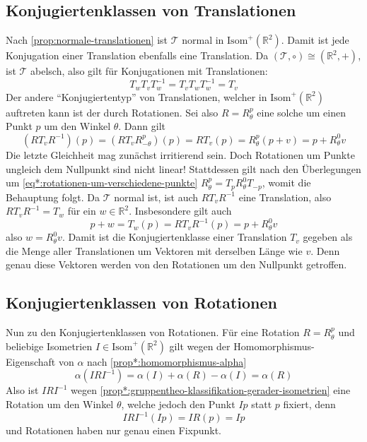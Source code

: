 \documentclass[a4paper, ngerman]{article}
\numberwithin{equation}{chapter}
\theoremstyle{plain}
\theoremstyle{definition}
\newcommand{\geradisometr}{\ensuremath{\mathrm{Isom}^+(\mathbb R^2)}}
\begin{document}
\subsection{Konjugiertenklassen von Translationen}\label{subsec:konjugiertenklassen-von-translationen}
Nach \cref{prop:normale-translationen} ist \(\mathcal T\) normal in \(\geradisometr\). Damit ist jede Konjugation einer Translation ebenfalls eine Translation. Da \((\mathcal T,\circ) \cong (\mathbb R^2, +)\), ist \(\mathcal T\) abelsch, also gilt für Konjugationen mit Translationen: 
\begin{equation*}
    T_w T_v T_w^{-1} = T_v T_w T_w^{-1} = T_v
\end{equation*}
Der andere "`Konjugiertentyp"' von Translationen, welcher in \(\geradisometr\) auftreten kann ist der durch Rotationen. Sei also \(R = R_\theta^p\) eine solche um einen Punkt \(p\) um den Winkel \(\theta\). Dann gilt 
\begin{equation*}
    (RT_vR^{-1})(p) = (RT_vR_{-\theta}^p)(p) = RT_v(p) = R_\theta^p (p+v) = p + R_\theta^0 v
\end{equation*}
Die letzte Gleichheit mag zunächst irritierend sein. Doch Rotationen um Punkte ungleich dem Nullpunkt sind nicht linear! Stattdessen gilt nach den Überlegungen um \eqref{eq*:rotationen-um-verschiedene-punkte} \(R_\theta^p = T_p R_\theta^0 T_{-p}\), womit die Behauptung folgt. Da \(\mathcal T\) normal ist, ist auch \(RT_vR^{-1}\) eine Translation, also \(RT_vR^{-1} = T_w\) für ein \(w \in \mathbb R^2\). Insbesondere gilt auch 
\begin{equation*}
    p + w = T_w(p) = RT_vR^{-1}(p) = p + R_\theta^0 v
\end{equation*}
also \(w = R_\theta^0 v\). Damit ist die Konjugiertenklasse einer Translation \(T_v\) gegeben als die Menge aller Translationen um Vektoren mit derselben Länge wie \(v\). Denn genau diese Vektoren werden von den Rotationen um den Nullpunkt getroffen. 

\subsection{Konjugiertenklassen von Rotationen}\label{subsec:konjugiertenklassen-von-rotationen}
Nun zu den Konjugiertenklassen von Rotationen. Für eine Rotation \(R = R_\theta^p\) und beliebige Isometrien \(I \in \geradisometr\) gilt wegen der Homomorphismus-Eigenschaft von \(\alpha\) nach \cref{prop*:homomorphismus-alpha}
\begin{equation*}
    \alpha(IRI^{-1}) = \alpha(I) + \alpha(R) - \alpha(I) = \alpha(R)
\end{equation*}
Also ist \(IRI^{-1}\) wegen \cref{prop*:gruppentheo-klassifikation-gerader-isometrien} eine Rotation um den Winkel \(\theta\), welche jedoch den Punkt \(Ip\) statt \(p\) fixiert, denn
\begin{equation*}
    IRI^{-1}(Ip) = IR(p) = Ip
\end{equation*}
und Rotationen haben nur genau einen Fixpunkt. %
\end{document}
